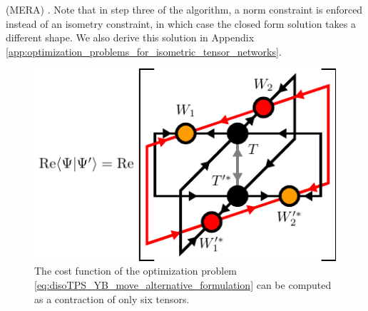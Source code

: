 (MERA) \cite{cite:algorithms_for_entanglement_renormalization, cite:algorithms_for_entanglement_renormalization_boundaries_impurities_interfaces}. Note that in step three of the algorithm, a norm constraint is enforced instead of an isometry constraint, in which case the closed form solution takes a different shape. We also derive this solution in Appendix \ref{app:optimization_problems_for_isometric_tensor_networks}.\par
\begin{figure}
	\centering
	\includegraphics[scale=1]{figures/tikz/disoTPS/yang_baxter_move_iterative/yang_baxter_move_iterative_a.pdf}
	\caption{The cost function of the optimization problem \eqref{eq:disoTPS_YB_move_alternative_formulation} can be computed as a contraction of only six tensors.}
	\label{fig:YB_move_iterate_polar_overlap}
\end{figure}
